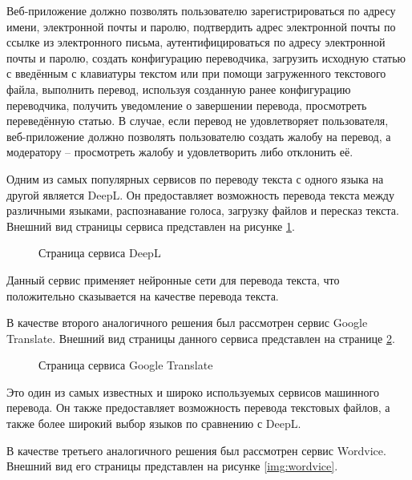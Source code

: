 \clearpage
{}

Веб-приложение должно позволять пользователю зарегистрироваться по адресу имени, электронной почты и паролю, подтвердить адрес электронной почты по ссылке из электронного письма, аутентифицироваться по адресу электронной почты и паролю, создать конфигурацию переводчика, загрузить исходную статью с введённым с клавиатуры текстом или при помощи загруженного текстового файла, выполнить перевод, используя созданную ранее конфигурацию переводчика, получить уведомление о завершении перевода, просмотреть переведённую статью. В случае, если перевод не удовлетворяет пользователя, веб-приложение должно позволять пользователю создать жалобу на перевод, а модератору – просмотреть жалобу и удовлетворить либо отклонить её.



Одним из самых популярных сервисов по переводу текста с одного языка на другой является DeepL. Он предоставляет возможность перевода текста между различными языками, распознавание голоса, загрузку файлов и пересказ текста. Внешний вид страницы сервиса представлен на рисунке \ref{img:deepl}.

\begin{figure}[H]
    \centering
    \caption{Страница сервиса DeepL \label{img:deepl}}
\end{figure}
Данный сервис применяет нейронные сети для перевода текста, что положительно сказывается на качестве перевода текста.

В качестве второго аналогичного решения был рассмотрен сервис Google Translate. Внешний вид страницы данного сервиса представлен на странице \ref{img:gtranslate}.

\begin{figure}[H]
    \centering
    \caption{Страница сервиса Google Translate \label{img:gtranslate}}
\end{figure}
Это один из самых известных и широко используемых сервисов машинного перевода. Он также предоставляет возможность перевода текстовых файлов, а также более широкий выбор языков по сравнению с DeepL.

В качестве третьего аналогичного решения был рассмотрен сервис Wordvice. Внешний вид его страницы представлен на рисунке \ref{img:wordvice}.

